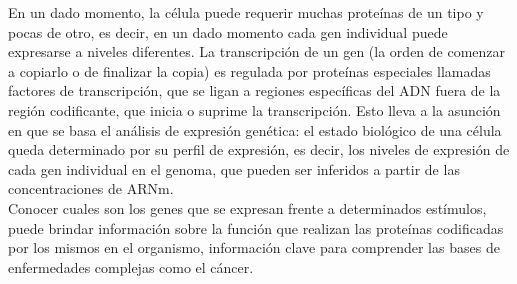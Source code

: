 En un dado momento, la célula puede requerir muchas proteínas de un tipo y pocas de otro, es decir, en un dado momento cada gen individual puede expresarse a niveles diferentes. La transcripción de un gen (la orden de comenzar a copiarlo o de finalizar la copia) es regulada por proteínas especiales llamadas factores de transcripción, que se ligan a regiones específicas del ADN fuera de la región codificante, que inicia o suprime la transcripción. Esto lleva a la asunción en que se basa el análisis de expresión genética: el estado biológico de una célula queda determinado por su perfil de expresión, es decir, los niveles de expresión de cada gen individual en el genoma, que pueden ser inferidos a partir de las concentraciones de ARNm.\\
Conocer cuales son los genes que se expresan frente a determinados estímulos, puede brindar información sobre la función que realizan las proteínas codificadas por los mismos en el organismo, información clave para comprender las bases de enfermedades complejas como el cáncer.